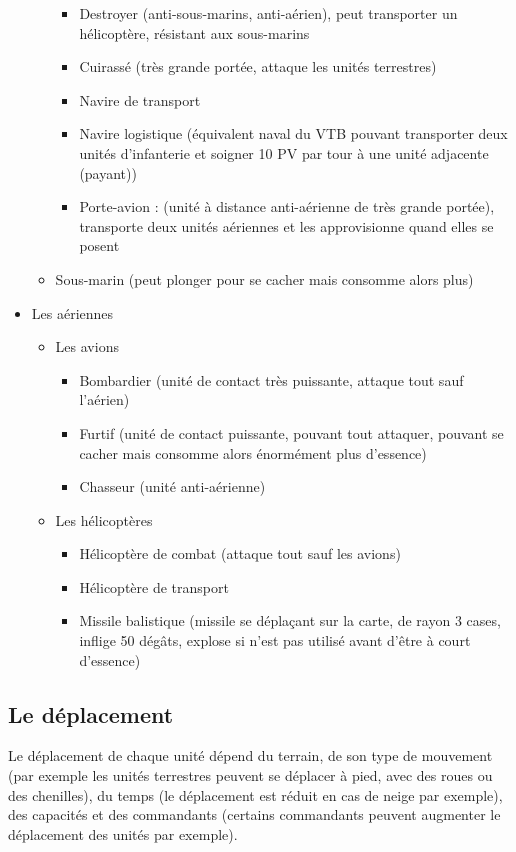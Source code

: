 \documentclass[a4paper,10pt]{article} %
\begin{document}
\begin{itemize}
\begin{itemize}
    \begin{itemize}
        \item Destroyer (anti-sous-marins, anti-aérien), peut transporter un hélicoptère, résistant aux sous-marins
        \item Cuirassé (très grande portée, attaque les unités terrestres)
        \item Navire de transport
        \item Navire logistique (équivalent naval du VTB pouvant transporter deux unités d'infanterie et soigner 10 PV par tour à une unité adjacente (payant))
        \item Porte-avion : (unité à distance anti-aérienne de très grande portée), transporte deux unités aériennes et les approvisionne quand elles se posent
    \end{itemize}
    \item Sous-marin (peut plonger pour se cacher mais consomme alors plus)
\end{itemize}
\item Les aériennes
\begin{itemize}
    \item Les avions
    \begin{itemize}
        \item Bombardier (unité de contact très puissante, attaque tout sauf l'aérien)
        \item Furtif (unité de contact puissante, pouvant tout attaquer, pouvant se cacher mais consomme alors énormément plus d'essence)
        \item Chasseur (unité anti-aérienne)
    \end{itemize}
    \item Les hélicoptères
    \begin{itemize}
        \item Hélicoptère de combat (attaque tout sauf les avions)
        \item Hélicoptère de transport
        \item Missile balistique (missile se déplaçant sur la carte, de rayon 3 cases, inflige 50 dégâts, explose si n'est pas utilisé avant d'être à court d'essence)
    \end{itemize}
\end{itemize}
\end{itemize}

\subsection{Le déplacement}
Le déplacement de chaque unité dépend du terrain, de son type de mouvement (par exemple les unités terrestres peuvent se déplacer à pied, avec des roues ou des chenilles), du temps (le déplacement est réduit en cas de neige par exemple), des capacités et des commandants (certains commandants peuvent augmenter le déplacement des unités par exemple).
\end{document}
